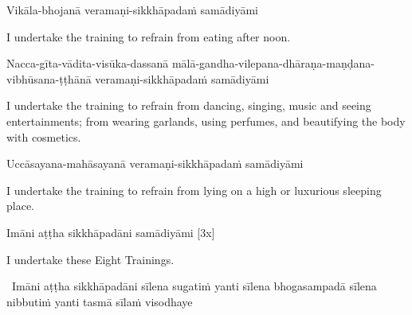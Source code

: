 Vikāla-bhojanā veramaṇi-sikkhāpadaṁ samādiyāmi

\begin{english-hang}
  I undertake the training to refrain from eating after noon.\ifdigital\makeatletter\hyperlink{endnote142-appendix}\makeatother\fi
\end{english-hang}

\ifninebythirteen\clearpage\fi

\begin{pali-hang}
  Nacca-gīta-vādita-visūka-dassanā mālā-gandha-vilepana-dhāraṇa-maṇḍana-vibhūsana-ṭṭhānā veramaṇi-sikkhāpadaṁ samādiyāmi
\end{pali-hang}

\begin{english-hang}
  I undertake the training to refrain from dancing, singing, music and seeing entertainments; from wearing garlands, using perfumes, and beautifying the body with cosmetics.\ifdigital\makeatletter\hyperlink{endnote143-appendix}\makeatother\fi\
\end{english-hang}

\ifbfive\clearpage\fi

\begin{pali-hang}
Uccāsayana-mahāsayanā veramaṇi-sikkhāpadaṁ samādiyāmi
\end{pali-hang}

\begin{english-hang}
  I undertake the training to refrain from lying on a high or luxurious sleeping place.
\end{english-hang}

Imāni aṭṭha sikkhāpadāni samādiyāmi \hfill{[3x]}

\begin{english}
  I undertake these Eight Trainings.
\end{english}

\ifninebythirteen\clearpage\fi

\begin{leader-pali}
  \anglebracketleft\ \hspace{-0.5mm}Imāni aṭṭha sikkhāpadāni sīlena sugatiṁ yanti sīlena bhogasampadā sīlena nibbutiṁ yanti tasmā sīlaṁ visodhaye \hspace{-0.5mm}\anglebracketright\
\end{leader-pali}


